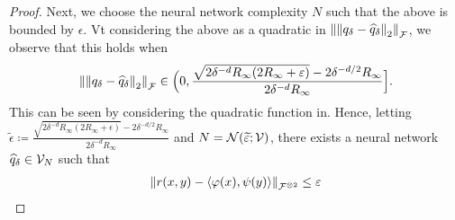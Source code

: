 \begin{proof}
    Next, we choose the neural network complexity $N$ such that the above is bounded by $\epsilon$. Vt considering the above as a quadratic in $\left\lVert\left\lVert q_\delta - \widehat{q}_\delta\right\rVert_{2}\right\rVert_{{\mathcal{F}}}$, we observe that this holds when
    \begin{equation*}
        \norm{\twonorm{q_\delta - \hat{q}_\delta}}_{\calF} \in \Big(0, \frac{\sqrt{2 \delta^{-d} R_\infty (2 R_\infty + \epsilon)} - 2 \delta^{-d / 2} R_\infty}{2 \delta^{-d} R_\infty} \Big].
    \end{equation*}
    This can be seen by considering the quadratic function in. Hence, letting $\tilde{\epsilon} \coloneq \frac{\sqrt{2 \delta^{-d} R_\infty (2 R_\infty + \epsilon)} - 2 \delta^{-d / 2} R_\infty}{2 \delta^{-d} R_\infty}$ and $N = {\mathcal{N}}(\widetilde{\varepsilon}; {\mathcal{V}})$, there exists a neural network $\widehat{q}_\delta \in {\mathcal{V}}_N$ such that
    \begin{align*}
        \norm{r(x,y) - \iprod{\phi(x)}{\psi(y)}}_{\calF^{\otimes 2}} \leq \epsilon
    \end{align*}
\end{proof}

